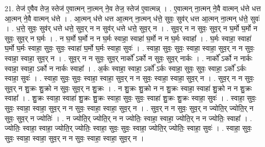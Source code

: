 \documentclass[17pt]{extarticle}
\begin{document}
21. तेज॑ ए॒वैव तेज॒ स्तेज॑ ए॒वात्मन् ना॒त्मन् ने॒व तेज॒ स्तेज॑ ए॒वात्मन्न् । . ए॒वात्मन् ना॒त्मन् ने॒वै वात्मन् ध॑त्ते धत्त आ॒त्मन् ने॒वै वात्मन् ध॑त्ते । . आ॒त्मन् ध॑त्ते धत्त आ॒त्मन् ना॒त्मन् ध॑त्ते॒ सुवः॒ सुव॑र् धत्त आ॒त्मन् ना॒त्मन् ध॑त्ते॒ सुवः॑ । . ध॒त्ते॒ सुवः॒ सुव॑र् धत्ते धत्ते॒ सुव॒र् न न सुव॑र् धत्ते धत्ते॒ सुव॒र् न । . सुव॒र् न न सुवः॒ सुव॒र् न घ॒र्मो घ॒र्मो न सुवः॒ सुव॒र् न घ॒र्मः । . न घ॒र्मो घ॒र्मो न न घ॒र्मः स्वाहा॒ स्वाहा॑ घ॒र्मो न न घ॒र्मः स्वाहा᳚ । . घ॒र्मः स्वाहा॒ स्वाहा॑ घ॒र्मो घ॒र्मः स्वाहा॒ सुवः॒ सुवः॒ स्वाहा॑ घ॒र्मो घ॒र्मः स्वाहा॒ सुवः॑ । . स्वाहा॒ सुवः॒ सुवः॒ स्वाहा॒ स्वाहा॒ सुव॒र् न न सुवः॒ स्वाहा॒ स्वाहा॒ सुव॒र् न । . सुव॒र् न न सुवः॒ सुव॒र् नार्को᳚ ऽर्को न सुवः॒ सुव॒र् नार्कः । . नार्को᳚ ऽर्को न नार्कः स्वाहा॒ स्वाहा॒ ऽर्को न नार्कः स्वाहा᳚ । . अ॒र्कः स्वाहा॒ स्वाहा॒ ऽर्को᳚ ऽर्कः स्वाहा॒ सुवः॒ सुवः॒ स्वाहा॒ ऽर्को᳚ ऽर्कः स्वाहा॒ सुवः॑ । . स्वाहा॒ सुवः॒ सुवः॒ स्वाहा॒ स्वाहा॒ सुव॒र् न न सुवः॒ स्वाहा॒ स्वाहा॒ सुव॒र् न । . सुव॒र् न न सुवः॒ सुव॒र् न शु॒क्रः शु॒क्रो न सुवः॒ सुव॒र् न शु॒क्रः । . न शु॒क्रः शु॒क्रो न न शु॒क्रः स्वाहा॒ स्वाहा॑ शु॒क्रो न न शु॒क्रः स्वाहा᳚ । . शु॒क्रः स्वाहा॒ स्वाहा॑ शु॒क्रः शु॒क्रः स्वाहा॒ सुवः॒ सुवः॒ स्वाहा॑ शु॒क्रः शु॒क्रः स्वाहा॒ सुवः॑ । . स्वाहा॒ सुवः॒ सुवः॒ स्वाहा॒ स्वाहा॒ सुव॒र् न न सुवः॒ स्वाहा॒ स्वाहा॒ सुव॒र् न । . सुव॒र् न न सुवः॒ सुव॒र् न ज्योति॒र् ज्योति॒र् न सुवः॒ सुव॒र् न ज्योतिः॑ । . न ज्योति॒र् ज्योति॒र् न न ज्योतिः॒ स्वाहा॒ स्वाहा॒ ज्योति॒र् न न ज्योतिः॒ स्वाहा᳚ । . ज्योतिः॒ स्वाहा॒ स्वाहा॒ ज्योति॒र् ज्योतिः॒ स्वाहा॒ सुवः॒ सुवः॒ स्वाहा॒ ज्योति॒र् ज्योतिः॒ स्वाहा॒ सुवः॑ । . स्वाहा॒ सुवः॒ सुवः॒ स्वाहा॒ स्वाहा॒ सुव॒र् न न सुवः॒ स्वाहा॒ स्वाहा॒ सुव॒र् न । \newline
\end{document}
